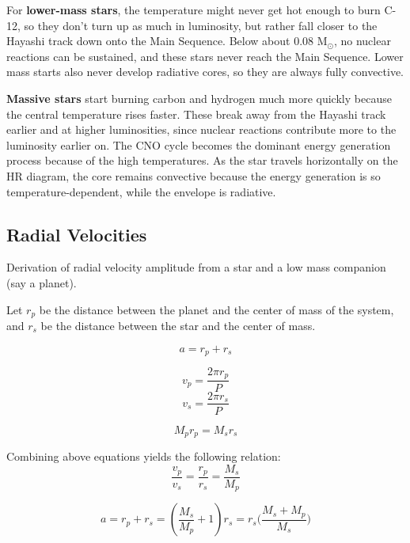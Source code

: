 For \textbf{lower-mass stars}, the temperature might never get hot enough to burn C-12, so they don't turn up as much in luminosity, but rather fall closer to the Hayashi track down onto the Main Sequence. Below about 0.08 M$_\odot$, no nuclear reactions can be sustained, and these stars never reach the Main Sequence. Lower mass starts also never develop radiative cores, so they are always fully convective.

\textbf{Massive stars} start burning carbon and hydrogen much more quickly because the central temperature rises faster. These break away from the Hayashi track earlier and at higher luminosities, since nuclear reactions contribute more to the luminosity earlier on. The CNO cycle becomes the dominant energy generation process because of the high temperatures. As the star travels horizontally on the HR diagram, the core remains convective because the energy generation is so temperature-dependent, while the envelope is radiative.


\subsection{Radial Velocities}

Derivation of radial velocity amplitude from a star and a low mass companion (say a planet).

Let $r_p$ be the distance between the planet and the center of mass of the system, and $r_s$ be the distance between the star and the center of mass.

\begin{equation}
a = r_p + r_s
\end{equation}

\begin{equation}
v_p = \frac{2\pi r_p}{P}
\end{equation}
\begin{equation}
v_s = \frac{2\pi r_s}{P}
\end{equation}

\begin{equation}
M_pr_p = M_sr_s
\end{equation}

Combining above equations yields the following relation:
\begin{equation}
\frac{v_p}{v_s} = \frac{r_p}{r_s} = \frac{M_s}{M_p}
\end{equation} 

\begin{equation}
a = r_p + r_s = (\frac{M_s}{M_p} + 1)r_s = r_s\big(\frac{M_s + M_p}{M_s}\big)
\end{equation}

